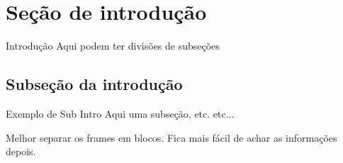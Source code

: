 \section{Seção de introdução}
\begin{frame}{Introdução}
  Aqui podem ter divisões de subseções
\end{frame}

\subsection{Subseção da introdução}
\begin{frame}{Exemplo de Sub Intro}
  Aqui uma subseção, etc. etc...

  Melhor separar os frames em blocos. Fica mais fácil de achar as informações depois.
\end{frame}
